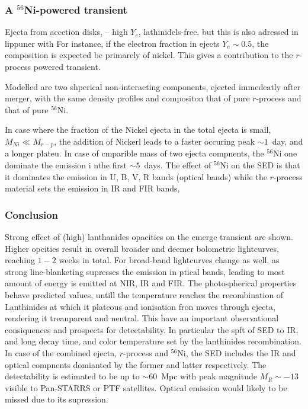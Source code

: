 \documentclass[11pt,a4paper,headinclude=true,DIV=14,BCOR=8mm,chapterprefix,listof=totoc,twoside,openright,abstracton]{scrbook}
\begin{document}
\subsubsection{A $^{56}$Ni-powered transient}
Ejecta from accetion disks, -- high $Y_e$, lathinidels-free.
\cite{(Surman et al. 2006, 2008; Metzger et al. 2008; Darbha et al. 2010}
but this is also adressed in lippuner with 
\cite{lippuner+2015}
For instance, if the electron fraction in ejects $Y_e \sim 0.5$, the composition is expected be primarely of nickel. This gives a contribution to the $r$-process powered transient. 

Modelled are two shperical non-interacting components, ejected immedeatly after merger, with the same density profiles and compositon that of pure $r$-process and that of pure $^{56}$Ni. 

In case where the fraction of the Nickel ejecta in the total ejecta is small, $M_{Ni} \ll M_{r-p}$, the addition of Nickerl leads to a faster occuring peak $\sim1$~day, and a longer plateu.
In case of cmparible mass of two ejecta compnents, the $^{56}$Ni one dominate the emission i nthe first $\sim 5$~days.
The effect of $^{56}$Ni on the SED is that it dominates the emission in U, B, V, R bands (optical bands) while the $r$-process material sets the emission in IR and FIR bands, 


\subsubsection{Conclusion}

Strong effect of (high) lanthanides opacities on the emerge transient are shown. 
Higher opcities result in overall broader and deemer bolometric lightcurves, reaching $1-2$ weeks in total. For broad-band lightcurves change as well, as strong line-blanketing supresses the emission in ptical bands, leading to most amount of energy is emitted at NIR, IR and FIR. The photospherical properties behave predicted values, untill the temperature reaches the recombination of Lanthinides at which it plateous and ionisation fron moves through ejecta, rendering it treanparent and neutral.
This have an important observational consiquences and prospects for detectability. In particular the spft of SED to IR, and long decay time, and color temperature set by the lanthinides recombination.
In case of the combined ejecta, $r$-process and $^{56}$Ni, the SED includes the IR and optical compnents domianted by the former and latter respectively. 
The detectability is estimated to be up to $\sim 60$~Mpc with peak magnitude $M_{R}\sim -13$ visible to Pan-STARRS or PTF satellites. Optical emission would likely to be missed due to its supression.
\end{document}
